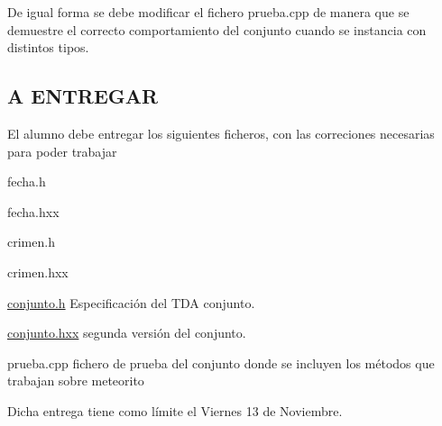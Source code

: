 De igual forma se debe modificar el fichero prueba.\+cpp de manera que se demuestre el correcto comportamiento del conjunto cuando se instancia con distintos tipos.\hypertarget{index_entrega}{}\subsection{A E\+N\+T\+R\+E\+G\+A\+R}\label{index_entrega}
El alumno debe entregar los siguientes ficheros, con las correciones necesarias para poder trabajar \begin{DoxyItemize}
\item fecha.\+h \item fecha.\+hxx \item crimen.\+h \item crimen.\+hxx \item \hyperlink{conjunto_8h_source}{conjunto.\+h} Especificación del T\+D\+A conjunto. \item \hyperlink{conjunto_8hxx_source}{conjunto.\+hxx} segunda versión del conjunto. \item prueba.\+cpp fichero de prueba del conjunto donde se incluyen los métodos que trabajan sobre meteorito\end{DoxyItemize}
Dicha entrega tiene como límite el Viernes 13 de Noviembre. 